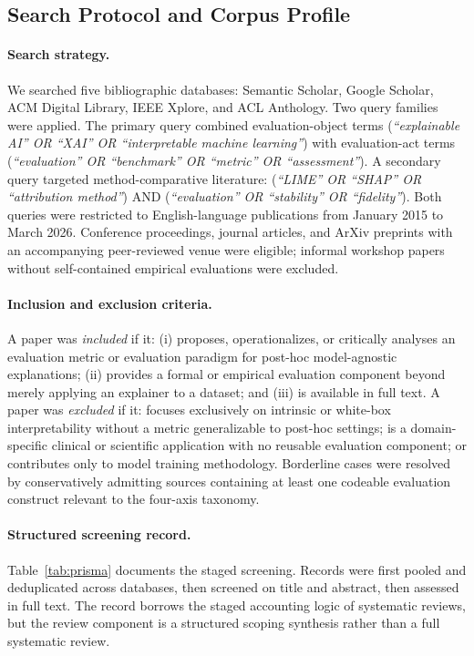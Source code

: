 \documentclass[twoside,11pt]{article}
\begin{document}
\subsection{Search Protocol and Corpus Profile}

\paragraph{Search strategy.}
We searched five bibliographic databases: Semantic Scholar, Google
Scholar, ACM Digital Library, IEEE Xplore, and ACL Anthology. Two
query families were applied. The primary query combined evaluation-object
terms (\emph{``explainable AI'' OR ``XAI'' OR ``interpretable machine
learning''}) with evaluation-act terms (\emph{``evaluation'' OR
``benchmark'' OR ``metric'' OR ``assessment''}). A secondary query
targeted method-comparative literature: (\emph{``LIME'' OR ``SHAP'' OR
``attribution method''}) AND (\emph{``evaluation'' OR ``stability'' OR
``fidelity''}). Both queries were restricted to English-language
publications from January 2015 to March 2026. Conference proceedings,
journal articles, and ArXiv preprints with an accompanying peer-reviewed
venue were eligible; informal workshop papers without self-contained
empirical evaluations were excluded.

\paragraph{Inclusion and exclusion criteria.}
A paper was \emph{included} if it: (i) proposes, operationalizes, or
critically analyses an evaluation metric or evaluation paradigm for
post-hoc model-agnostic explanations; (ii) provides a formal or
empirical evaluation component beyond merely applying an explainer to a
dataset; and (iii) is available in full text. A paper was \emph{excluded}
if it: focuses exclusively on intrinsic or white-box interpretability
without a metric generalizable to post-hoc settings; is a
domain-specific clinical or scientific application with no reusable
evaluation component; or contributes only to model training methodology.
Borderline cases were resolved by conservatively admitting sources
containing at least one codeable evaluation construct relevant to the
four-axis taxonomy.

\paragraph{Structured screening record.}
Table~\ref{tab:prisma} documents the staged screening. Records were
first pooled and deduplicated across databases, then screened on title
and abstract, then assessed in full text. The record borrows the staged
accounting logic of systematic reviews, but the review component is a
structured scoping synthesis rather than a full systematic review.
\end{document}
